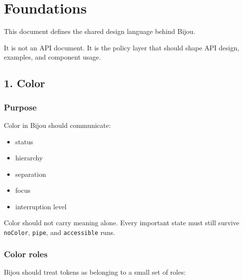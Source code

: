 \chapter{Foundations}\label{record-021}

\smallskip

This document defines the shared design language behind Bijou.

It is not an API document. It is the policy layer that should shape API design, examples, and component usage.

\section{1. Color}\label{record-021-color}

\subsection{Purpose}\label{record-021-purpose}

Color in Bijou should communicate:

\begin{itemize}
\tightlist
\item
  status
\item
  hierarchy
\item
  separation
\item
  focus
\item
  interruption level
\end{itemize}

Color should not carry meaning alone. Every important state must still survive \texttt{n\allowbreak{}o\allowbreak{}C\allowbreak{}o\allowbreak{}l\allowbreak{}o\allowbreak{}r}, \texttt{p\allowbreak{}i\allowbreak{}p\allowbreak{}e}, and \texttt{a\allowbreak{}c\allowbreak{}c\allowbreak{}e\allowbreak{}s\allowbreak{}s\allowbreak{}i\allowbreak{}b\allowbreak{}l\allowbreak{}e} runs.

\subsection{Color roles}\label{record-021-color-roles}

Bijou should treat tokens as belonging to a small set of roles:

